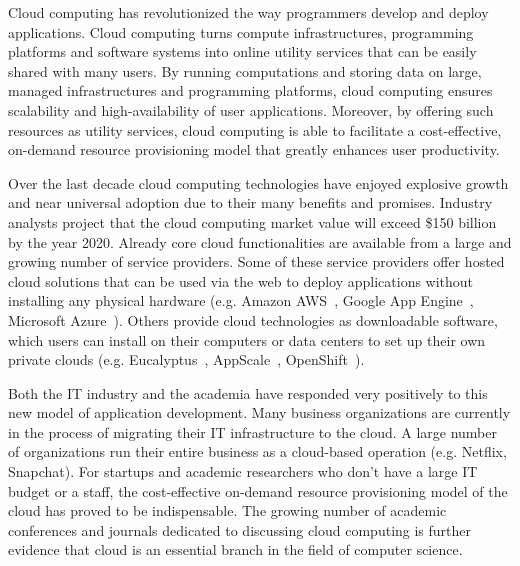 Cloud computing has revolutionized the way programmers develop and deploy applications.
Cloud computing turns compute infrastructures, programming platforms and software systems
into online utility services that can be easily shared with many users.
By running computations and storing data on large, managed infrastructures and 
programming platforms, cloud computing ensures scalability and high-availability of 
user applications. Moreover, by offering such resources
as utility services, cloud computing is able to facilitate a cost-effective, on-demand
resource provisioning model that greatly enhances user productivity.

Over the last decade cloud computing technologies have enjoyed explosive growth 
and near universal adoption due to their many benefits and promises. 
Industry analysts project that the cloud computing market value will exceed \$150 billion
by the year 2020.
Already core cloud 
functionalities are available from a large and growing number of service providers. 
Some of these service providers offer hosted cloud solutions that can be used
via the web to deploy applications without installing any physical hardware 
(e.g. Amazon AWS~\cite{amazon-aws-web}, Google App Engine~\cite{gae}, Microsoft Azure~\cite{azure-web}). Others
provide cloud technologies as downloadable software, which users can install
on their computers or data centers to set up their own private clouds 
(e.g. Eucalyptus~\cite{eucalyptus09}, AppScale~\cite{6488671}, OpenShift~\cite{openshift}). 

Both the IT industry and the academia have responded very positively to this new 
model of application 
development. Many business organizations are currently in the process of migrating
their IT infrastructure to the cloud. A large number of organizations
run their entire business as a cloud-based operation (e.g. Netflix, Snapchat). For startups
and academic researchers who don't have a large IT budget or a staff, the cost-effective 
on-demand resource provisioning model of the cloud has proved to be indispensable.
The growing number of academic conferences and journals dedicated to discussing
cloud computing is further evidence that cloud is an essential branch in the field
of computer science.

